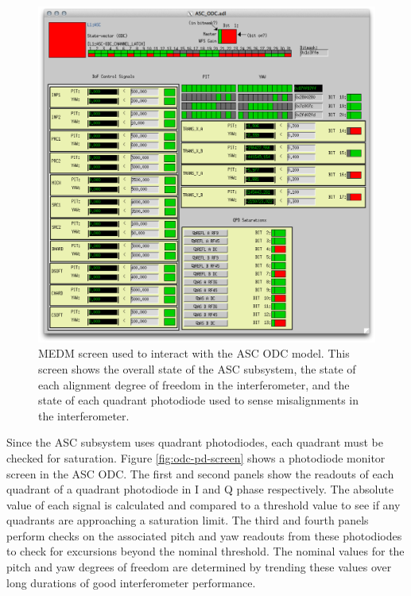 \begin{figure}[ht!]
\includegraphics[width=\textwidth]{figures/ODC/ASC_screen}
\caption[ASC ODC Overview Screen]{MEDM screen used to interact with the ASC ODC model. %
         This screen shows the overall state of the ASC subsystem, the state of each %
         alignment degree of freedom in the interferometer, and the state of each %
         quadrant photodiode used to sense misalignments in the interferometer.}
\label{fig:asc-odc}
\end{figure}

Since the ASC subsystem uses quadrant photodiodes, each quadrant must be checked 
for saturation. 
Figure \ref{fig:odc-pd-screen} shows a photodiode monitor screen in the ASC ODC. 
The first and second panels show the readouts of each quadrant of a quadrant 
photodiode in I and Q phase respectively. The absolute value of each signal is 
calculated and compared to a threshold value to see if any quadrants are approaching 
a saturation limit. The third and fourth panels perform checks on the associated 
pitch and yaw readouts from these photodiodes to check for excursions beyond the 
nominal threshold. The nominal values for the pitch and yaw degrees of freedom 
are determined by trending these values over long durations of good interferometer 
performance.

